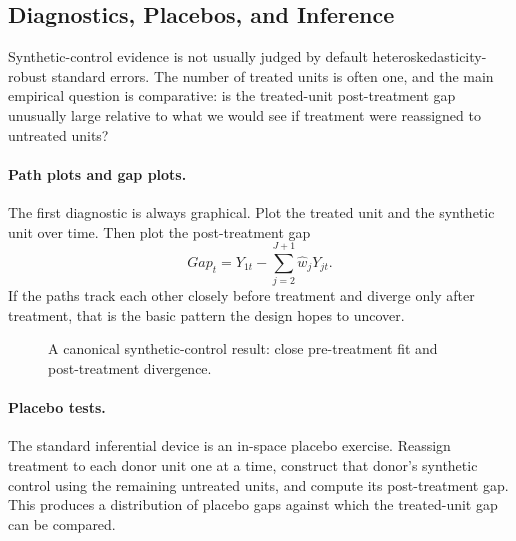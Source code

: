 \subsection{Diagnostics, Placebos, and Inference}
Synthetic-control evidence is not usually judged by default heteroskedasticity-robust standard errors. The number of treated units is often one, and the main empirical question is comparative: is the treated-unit post-treatment gap unusually large relative to what we would see if treatment were reassigned to untreated units?

\paragraph{Path plots and gap plots.}
The first diagnostic is always graphical. Plot the treated unit and the synthetic unit over time. Then plot the post-treatment gap
\[
Gap_t = Y_{1t} - \sum_{j=2}^{J+1}\hat{w}_jY_{jt}.
\]
If the paths track each other closely before treatment and diverge only after treatment, that is the basic pattern the design hopes to uncover.

\begin{figure}[h]
\centering
{}
\caption{A canonical synthetic-control result: close pre-treatment fit and post-treatment divergence.}
\label{fig:sc_main_plot}
\end{figure}

\paragraph{Placebo tests.}
The standard inferential device is an in-space placebo exercise. Reassign treatment to each donor unit one at a time, construct that donor's synthetic control using the remaining untreated units, and compute its post-treatment gap. This produces a distribution of placebo gaps against which the treated-unit gap can be compared.

